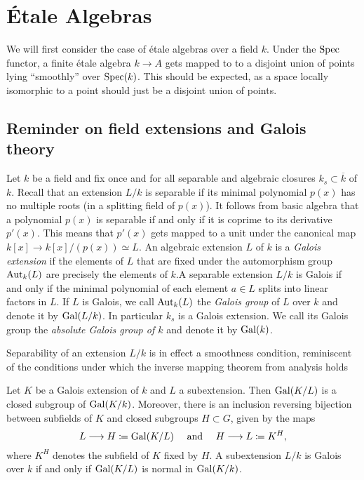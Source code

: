 \section{\'Etale Algebras}
We will first consider the case of \'etale algebras over a field $k$. Under the $\operatorname{Spec}$ functor, a finite \'etale algebra $k \to A$ gets mapped to to a disjoint union of points lying ``smoothly'' over $\operatorname{Spec}(k)$. This should be expected, as a space locally isomorphic to a point should just be a disjoint union of points.

\subsection{Reminder on field extensions and Galois theory}
\begin{construction}
	Let $k$ be a field and fix once and for all separable and algebraic closures $k_s \subset \overline{k}$ of $k$. Recall that an extension $L/k$ is separable if its minimal polynomial $p(x)$ has no multiple roots (in a splitting field of $p(x)$). It follows from basic algebra that a polynomial $p(x)$ is separable if and only if it is coprime to its derivative $p'(x)$. This means that $p'(x)$ gets mapped to a unit under the canonical map $k[x] \to k[x]/(p(x)) \simeq L$. An algebraic extension $L$ of $k$ is a \textit{Galois extension} if the elements of $L$ that are fixed under the automorphism group $\operatorname{Aut}_k(L)$ are precisely the elements of $k$.A separable extension $L/k$ is Galois if and only if the minimal polynomial of each element $a \in L$ splits into linear factors in $L$. If $L$ is Galois, we call $\operatorname{Aut}_k(L)$ the \textit{Galois group} of $L$ over $k$ and denote it by $\operatorname{Gal}(L/k)$. In particular $k_s$ is a Galois extension. We call its Galois group the \textit{absolute Galois group of $k$} and denote it by $\operatorname{Gal}(k)$.
\end{construction}

\begin{remark}
	Separability of an extension $L/k$ is in effect a smoothness condition, reminiscent of the conditions under which the inverse mapping theorem from analysis holds
\end{remark}

\begin{theorem}
	Let $K$ be a Galois extension of $k$ and $L$ a subextension. Then $\operatorname{Gal}(K/L)$ is a closed subgroup of $\operatorname{Gal}(K/k)$. Moreover, there is an inclusion reversing bijection between subfields of $K$ and closed subgroups $H \subset G$, given by the maps
	\[
		L \longrightarrow H \coloneqq \operatorname{Gal}(K/L) \quad \text{ and } \quad H \longrightarrow L \coloneqq K^H,
	\]
	where $K^H$ denotes the subfield of $K$ fixed by $H$. A subextension $L/k$ is Galois over $k$ if and only if $\operatorname{Gal}(K/L)$ is normal in $\operatorname{Gal}(K/k)$.
\end{theorem}

